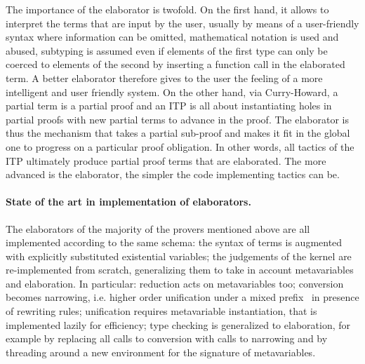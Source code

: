 \documentclass{easychair}
\begin{document}
The importance of the elaborator is twofold. On the first hand, it
allows to interpret the terms that are input by the user, usually by
means of a user-friendly syntax where information can be omitted,
mathematical notation is used and abused, subtyping is assumed even if
elements of the first type can only be coerced to elements of the
second by inserting a function call in the elaborated term. A better
elaborator therefore gives to the user the feeling of a more
intelligent and user friendly system. On the other hand, via
Curry-Howard, a partial term is a partial proof and an ITP is all
about instantiating holes in partial proofs with new partial terms to
advance in the proof. The elaborator is thus the mechanism that takes
a partial sub-proof and makes it fit in the global one to progress on
a particular proof obligation. In other words, all tactics of the ITP
ultimately produce partial proof terms that are elaborated. The more
advanced is the elaborator, the simpler the code implementing tactics
can be.


\paragraph{State of the art in implementation of elaborators.}

The elaborators of the majority of the provers mentioned above are all
implemented according to the same schema: the syntax of terms is
augmented with explicitly substituted existential variables; the
judgements of the kernel are re-implemented from scratch, generalizing
them to take in account metavariables and elaboration. In particular:
reduction acts on metavariables too; conversion becomes narrowing,
i.e. higher order unification under a mixed prefix~\cite{???} in
presence of rewriting rules; unification requires metavariable
instantiation, that is implemented lazily for efficiency; type
checking is generalized to elaboration, for example by replacing all
calls to conversion with calls to narrowing and by threading around a
new environment for the signature of metavariables.
\end{document}
